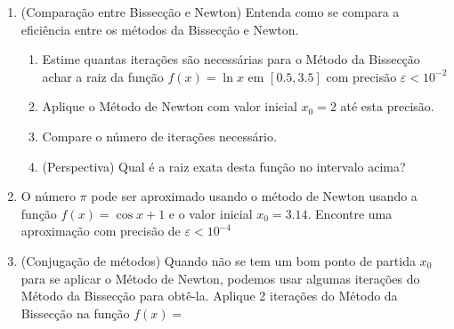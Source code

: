\documentclass[a4paper]{article}
\begin{document}
\begin{enumerate}
\item (Comparação entre Bissecção e Newton) Entenda como se compara a
  eficiência entre os métodos da Bissecção e Newton.

  \begin{enumerate}
  \item Estime quantas iterações são necessárias para o Método da
    Bissecção achar a raiz da função $f(x)=\ln x$ em $[0.5, 3.5]$ com
    precisão $\varepsilon < 10^{-2}$
  \item Aplique o Método de Newton com valor inicial $x_0 = 2$ até esta
    precisão.
  \item Compare o número de iterações necessário.
  \item (Perspectiva) Qual é a raiz exata desta função no intervalo
    acima?
  \end{enumerate}
 

\item O número $\pi$ pode ser aproximado usando o método de Newton
  usando a função $f(x) = \cos x +1$ e o valor inicial $x_0 =
  3.14$. Encontre uma aproximação com precisão de $\varepsilon <
  10^{-4}$

\item (Conjugação de métodos) Quando não se tem um bom ponto de
  partida $x_0$ para se aplicar o Método de Newton, podemos usar
  algumas iterações do Método da Bissecção para obtê-la. Aplique 2
  iterações do Método da Bissecção na função $f(x)=$

\end{enumerate}
\end{document}

